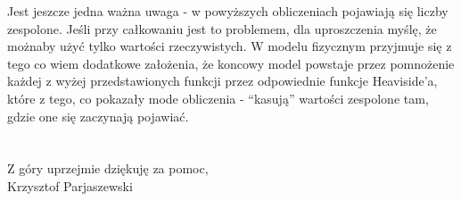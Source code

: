 \documentclass[12pt,twoside,a4paper]{article}
\begin{document}
Jest jeszcze jedna ważna uwaga - w powyższych obliczeniach pojawiają się liczby zespolone. Jeśli przy całkowaniu jest to problemem,
dla uproszczenia myślę, że możnaby użyć tylko wartości rzeczywistych. W modelu fizycznym przyjmuje się z tego co wiem dodatkowe
założenia, że koncowy model powstaje przez pomnożenie każdej z wyżej przedstawionych funkcji przez odpowiednie funkcje Heaviside'a,
które z tego, co pokazały mode obliczenia - ``kasują'' wartości zespolone tam, gdzie one się zaczynają pojawiać. 

\section*{}
\subsection*{}

Z góry uprzejmie dziękuję za pomoc, \\
Krzysztof Parjaszewski
\end{document}
